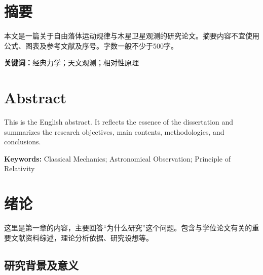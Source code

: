 \documentclass[a4paper,zihao=-4,twoside,openany,fontset=none]{ctexbook}
\begin{document}
\setlength{\baselineskip}{22pt}

\frontmatter
{} %

\chapter*{摘要}

本文是一篇关于自由落体运动规律与木星卫星观测的研究论文。摘要内容不宜使用公式、图表及参考文献及序号。字数一般不少于500字。

\vspace{1em}
\noindent\textbf{关键词：}经典力学；天文观测；相对性原理

\clearpage

\chapter*{\textbf{Abstract}}

This is the English abstract. It reflects the essence of the dissertation and summarizes the research objectives, main contents, methodologies, and conclusions.

\vspace{1em}
\noindent\textbf{Keywords: } Classical Mechanics; Astronomical Observation; Principle of Relativity

\clearpage

\tableofcontents
{}
\clearpage

\mainmatter
{} %

\chapter{绪论}
这里是第一章的内容，主要回答“为什么研究”这个问题。包含与学位论文有关的重要文献资料综述，理论分析依据、研究设想等。

\section{研究背景及意义}
\end{document}
